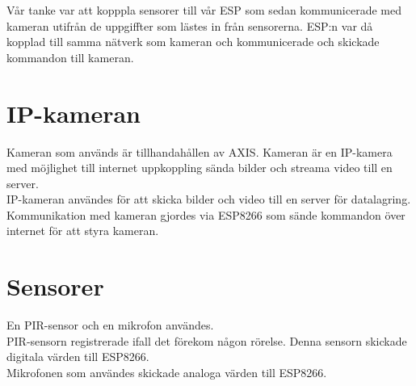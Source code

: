 Vår tanke var att kopppla sensorer till vår ESP som sedan kommunicerade med kameran utifrån de uppgiffter som lästes in från sensorerna. ESP:n var då kopplad till samma nätverk som kameran och kommunicerade och skickade kommandon till kameran.\\

\section{IP-kameran}
Kameran som används är tillhandahållen av AXIS. Kameran är en IP-kamera med möjlighet till internet uppkoppling sända bilder och streama video till en server.\\

IP-kameran användes för att skicka bilder och video till en server för datalagring.\\

Kommunikation med kameran gjordes via ESP8266 som sände kommandon över internet för att styra kameran.\\

\section{Sensorer}
En PIR-sensor och en mikrofon användes.\\

PIR-sensorn registrerade ifall det förekom någon rörelse. Denna sensorn skickade digitala värden till ESP8266.\\

Mikrofonen som användes skickade analoga värden till ESP8266.\\






 



